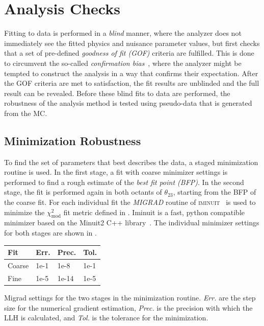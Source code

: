 \section{Analysis Checks}

Fitting to data is performed in a \textit{blind} manner, where the analyzer does not immediately see the fitted physics and nuisance parameter values, but first checks that a set of pre-defined \textit{goodness of fit (GOF)} criteria are fulfilled. This is done to circumvent the so-called \textit{confirmation bias}~, where the analyzer might be tempted to construct the analysis in a way that confirms their expectation. After the GOF criteria are met to satisfaction, the fit results are unblinded and the full result can be revealed. Before these blind fits to data are performed, the robustness of the analysis method is tested using pseudo-data that is generated from the MC.


\subsection{Minimization Robustness} 

To find the set of parameters that best describes the data, a staged minimization routine is used. In the first stage, a fit with coarse minimizer settings is performed to find a rough estimate of the \textit{best fit point (BFP)}. In the second stage, the fit is performed again in both octants of $\theta_{23}$, starting from the BFP of the coarse fit. For each individual fit the \textit{MIGRAD} routine of \textsc{iminuit}~ is used to minimize the $\chi^2_{\mathrm{mod}}$ fit metric defined in . Iminuit is a fast, python compatible minimizer based on the Minuit2 C++ library~\cite{og_minuit}. The individual minimizer settings for both stages are shown in .

\begin{margintable}
    \small
        \begin{tabular}{ llll }
        \hline\hline
        \textbf{Fit} & \textbf{Err.} & \textbf{Prec.} & \textbf{Tol.} \\
        \hline\hline
        Coarse & 1e-1 & 1e-8 & 1e-1 \\
        Fine & 1e-5 & 1e-14 & 1e-5 \\
        \hline
        \end{tabular}
    \caption[Staged minimization routine settings]{Migrad settings for the two stages in the minimization routine. \textit{Err.} are the step size for the numerical gradient estimation, \textit{Prec.} is the precision with which the LLH is calculated, and \textit{Tol.} is the tolerance for the minimization.}
\end{margintable}

